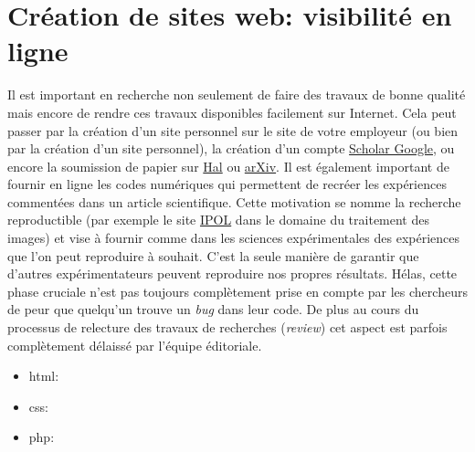 \section{Création de sites web: visibilité en ligne}
Il est important en recherche non seulement de faire des travaux de bonne qualité
mais encore de rendre ces travaux disponibles facilement sur Internet. Cela peut passer par la création
d'un site personnel sur le site de votre employeur (ou bien par la création d'un site personnel),
la création d'un compte \href{http://scholar.google.com}{Scholar Google}, ou encore la soumission de papier
sur \href{http://hal.archives-ouvertes.fr/}{Hal} ou \href{http://arxiv.org/}{arXiv}.
Il est également important de fournir en ligne les codes numériques qui permettent de recréer les 
expériences commentées dans un article scientifique. Cette motivation se nomme 
la recherche reproductible (\lcf par exemple le site \href{http://www.ipol.im/}{IPOL} dans le domaine
du traitement des images)  et vise à fournir comme dans les sciences expérimentales des expériences 
que l'on peut reproduire à souhait. C'est la seule manière de garantir que d'autres expérimentateurs
peuvent reproduire nos propres résultats. Hélas, cette phase cruciale n'est pas toujours complètement 
prise en compte par les chercheurs de peur que quelqu'un trouve un \textit{bug} dans leur code.
De plus au cours du processus de relecture des travaux de recherches (\textit{review}) cet
aspect est parfois complètement délaissé par l'équipe éditoriale.

\begin{itemize}
 \item  html:
 \item  css:
 \item  php:
\end{itemize}


